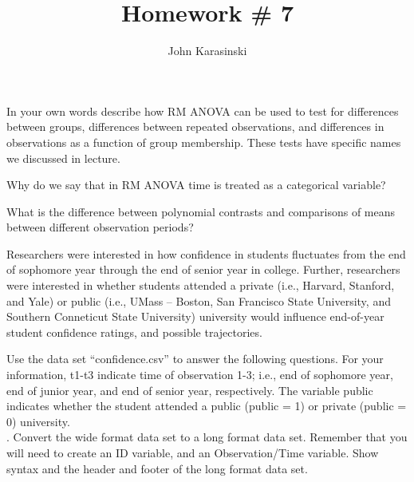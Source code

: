 \documentclass[onecolumn,10pt]{jhwhw}
\author{John Karasinski}
\title{Homework \# 7}
\begin{document}

\problem{}
In your own words describe how RM ANOVA can be used to test for differences between groups, differences between repeated observations, and differences in observations as a function of group membership. These tests have specific names we discussed in lecture.

\problem{}
Why do we say that in RM ANOVA time is treated as a categorical variable?


\problem{}
What is the difference between polynomial contrasts and comparisons of means between different observation periods?

\clearpage
\problem{}
Researchers were interested in how confidence in students fluctuates from the end of sophomore year through the end of senior year in college. Further, researchers were interested in whether students attended a private (i.e., Harvard, Stanford, and Yale) or public (i.e., UMass – Boston, San Francisco State University, and Southern Conneticut State University) university would influence end-of-year student confidence ratings, and possible trajectories.

Use the data set “confidence.csv” to answer the following questions. For your information, t1-t3 indicate time of observation 1-3; i.e., end of sophomore year, end of junior year, and end of senior year, respectively. The variable public indicates whether the student attended a public (public = 1) or private (public = 0) university.\\

. Convert the wide format data set to a long format data set. Remember that you will need to create an ID variable, and an Observation/Time variable. Show syntax and the header and footer of the long format data set.
\end{document}
